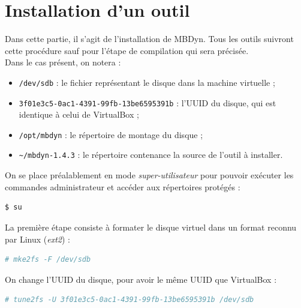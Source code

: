 
\section{Installation d'un outil}

Dans cette partie, il s'agit de l'installation de MBDyn.
Tous les outils suivront cette procédure sauf pour l'étape de compilation qui sera précisée.
\\


Dans le cas présent, on notera :
\begin{itemize}
	\item \lstinline{/dev/sdb} : le fichier représentant le disque dans la machine virtuelle ;
	\item \lstinline{3f01e3c5-0ac1-4391-99fb-13be6595391b} : l'UUID du disque, qui est identique à celui de VirtualBox ;
	\item \lstinline{/opt/mbdyn} : le répertoire de montage du disque ;
	\item \lstinline{~/mbdyn-1.4.3} : le répertoire contenance la source de l'outil à installer.
\\
\end{itemize}


On se place préalablement en mode \textit{super-utilisateur} pour pouvoir exécuter les commandes administrateur et accéder aux répertoires protégés :
\begin{lstlisting}[language = sh]
$ su
\end{lstlisting}

La première étape consiste à formater le disque virtuel dans un format reconnu par Linux (\textit{ext2}) :
\begin{lstlisting}[language = sh]
# mke2fs -F /dev/sdb
\end{lstlisting}

On change l'UUID du disque, pour avoir le même UUID que VirtualBox :
\begin{lstlisting}[language = sh]
# tune2fs -U 3f01e3c5-0ac1-4391-99fb-13be6595391b /dev/sdb
\end{lstlisting}


